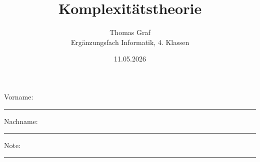 \newtoggle{withbonus} \toggletrue{withbonus} %

\newcommand{\mycourse}{Ergänzungsfach Informatik}
\newcommand{\myclass}{4. Klassen}
\newcommand{\mydate}{11.05.2026}

\title{\textbf{Komplexitätstheorie}}
\author{Thomas Graf\\
	\mycourse, \myclass}
\date{\mydate}
\maketitle
\thispagestyle{headandfoot}

\begin{center}
\end{center}
\vspace{10mm}

\begin{center}
	Vorname: \rule{45mm}{0.8pt}\qquad Nachname: \rule{45mm}{0.8pt}
\end{center}
\vspace{20mm}

\begin{center}
	\iftoggle{withbonus} {
		\combinedgradetable[h][questions]
	} {
		\gradetable[h][questions]
	}
\end{center}
\vspace{15mm}
\begin{center}
	Note:
	\vspace{10mm}

	\rule{8mm}{1.2pt}
\end{center}

\clearpage


